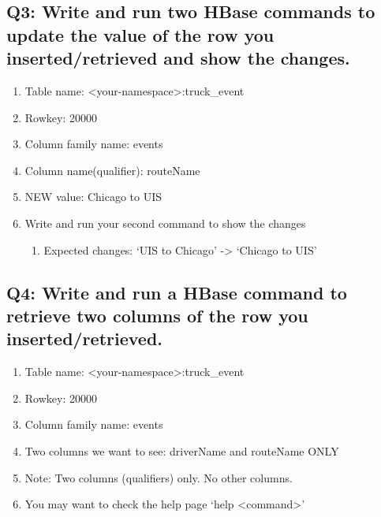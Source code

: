 \documentclass[]{article}
\begin{document}
\subsection*{Q3: Write and run two HBase commands to update the value of the row you inserted/retrieved and show the changes.} 
\begin{enumerate}[before=\itshape,font=\normalfont,label=(\alph*)]
	\item Table name: <your-namespace>:truck\_event
	\item Rowkey: 20000
	\item Column family name: events
	\item Column name(qualifier): routeName
	\item NEW value: Chicago to UIS
	\item Write and run your second command to show the changes
	\begin{enumerate}[label=(\roman*)]
		\item Expected changes: ‘UIS to Chicago’ -> ‘Chicago to UIS’
	\end{enumerate}
\end{enumerate}

\subsection*{Q4: Write and run a HBase command to retrieve two columns of the row you inserted/retrieved.} 
\begin{enumerate}[before=\itshape,font=\normalfont,label=(\alph*)]
	\item Table name: <your-namespace>:truck\_event
	\item Rowkey: 20000
	\item Column family name: events
	\item Two columns we want to see: driverName and routeName ONLY
	\item Note: Two columns (qualifiers) only. No other columns.
	\item You may want to check the help page ‘help <command>’
\end{enumerate}
\end{document}
